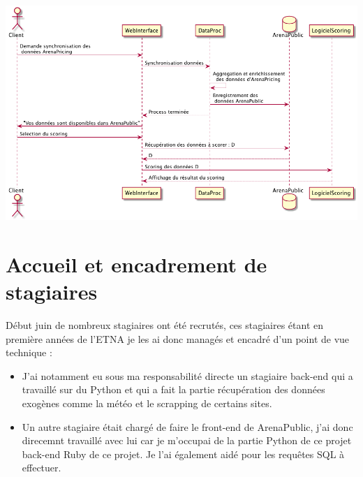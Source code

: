 \begin{center}
\includegraphics[scale=0.52]{images/scoring.png}
\label{scoring}
\end{center}


\section{Accueil et encadrement de stagiaires}
Début juin de nombreux stagiaires ont été recrutés, ces stagiaires étant en première années de l'ETNA je les ai donc managés et encadré d'un point de vue technique :
\begin{itemize}
	\item[\textbullet] J'ai notamment eu sous ma responsabilité directe un stagiaire back-end qui a travaillé sur du Python et qui a fait la partie récupération des données exogènes comme la météo et le scrapping de certains sites. 
	\item[\textbullet] Un autre stagiaire était chargé de faire le front-end de ArenaPublic, j'ai donc direcemnt travaillé avec lui car je m'occupai de la partie Python de ce projet back-end Ruby de ce projet. Je l'ai également aidé pour les requêtes SQL à effectuer.
\end{itemize}

  


